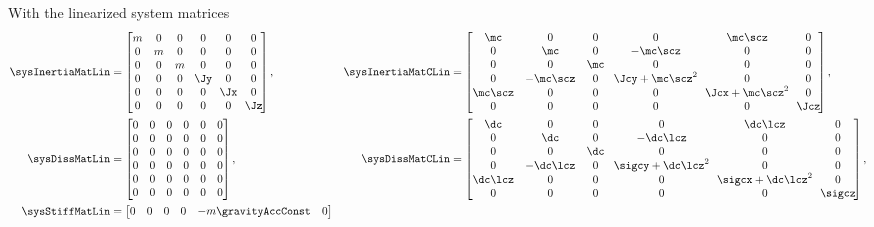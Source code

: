 With the linearized system matrices
\begin{align*}
 \sysInertiaMatLin &= 
 \begin{bmatrix}
  m & 0 & 0 & 0 & 0 & 0 \\
  0 & m & 0 & 0 & 0 & 0 \\
  0 & 0 & m & 0 & 0 & 0 \\
  0 & 0 & 0 & \!\Jy\! & 0 & 0 \\
  0 & 0 & 0 & 0 & \!\Jx\! & 0 \\
  0 & 0 & 0 & 0 & 0 & \!\Jz\! \\
  \end{bmatrix},&
 \sysInertiaMatCLin &=
 \begin{bmatrix}
  \mc & 0 & 0 & 0 & \mc\scz & 0 \\
  0 & \mc & 0 & -\mc\scz & 0 & 0 \\
  0 & 0 & \mc & 0 & 0 & 0 \\
  0 & -\mc\scz & 0 & \!\Jcy+\mc\scz^2\! & 0 & 0 \\
  \mc\scz & 0 & 0 & 0 & \!\Jcx+\mc\scz^2\! & 0 \\
  0 & 0 & 0 & 0 & 0 & \!\Jcz\! \\
 \end{bmatrix},
\\
 \sysDissMatLin &= 
 \begin{bmatrix}
  0 & 0 & 0 & 0 & 0 & 0 \\
  0 & 0 & 0 & 0 & 0 & 0 \\
  0 & 0 & 0 & 0 & 0 & 0 \\
  0 & 0 & 0 & 0 & 0 & 0 \\
  0 & 0 & 0 & 0 & 0 & 0 \\
  0 & 0 & 0 & 0 & 0 & 0 \\
  \end{bmatrix},&
 \sysDissMatCLin &=
 \begin{bmatrix}
  \dc & 0 & 0 & 0 & \dc\lcz & 0 \\
  0 & \dc & 0 & -\dc\lcz & 0 & 0 \\
  0 & 0 & \dc & 0 & 0 & 0 \\
  0 & -\dc\lcz & 0 & \!\sigcy+\dc\lcz^2\! & 0 & 0 \\
  \dc\lcz & 0 & 0 & 0 & \!\sigcx+\dc\lcz^2\! & 0 \\
  0 & 0 & 0 & 0 & 0 & \!\sigcz\! \\
 \end{bmatrix},
\\ 
 \sysStiffMatLin &= 
 \begin{bmatrix}
  0 & 0 & 0 & 0 & -m\gravityAccConst & 0 \\

\end{bmatrix}
\end{align*}
